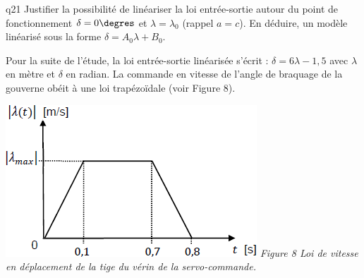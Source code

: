 \begin{multicols}{2}
{\begin{question}{q21}
Justifier la possibilité de linéariser la loi entrée-sortie autour du point de fonctionnement
$\delta = 0\degres$ et $\lambda=\lambda_0$ (rappel $a=c$). En déduire, un modèle linéarisé sous la forme $\delta=A_0 \lambda + B_0$.
\ifprof
\begin{corrige}
\end{corrige}
\else
\fi
\begin{reponses}
\end{reponses} \end{question}}  


Pour la suite de l’étude, la loi entrée-sortie linéarisée s’écrit : $\delta = 6\lambda - 1,5$ 
avec $\lambda$ en mètre et $\delta$ en radian. 
La commande en vitesse de l’angle de braquage de la gouverne obéit à une loi trapézoïdale (voir Figure 8).


\begin{center}
\includegraphics[width=\linewidth]{images/fig_09}
\textit{Figure 8 Loi de vitesse en déplacement de la tige
du vérin de la servo-commande.}
\end{center}

  


\end{multicols}
